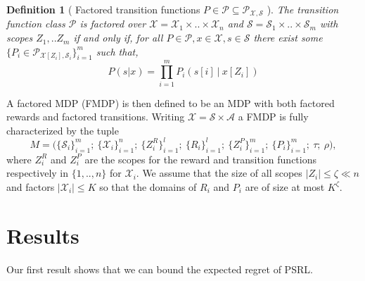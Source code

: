 \documentclass{article}
\newtheorem{mydef}{Definition}
\newcommand{\Xc}{\mathcal{X}}
\newcommand{\Pc}{\mathcal{P}}
\newcommand{\Sc}{\mathcal{S}}
\newcommand{\Ac}{\mathcal{A}}
\begin{document}
\begin{mydef}[ Factored transition functions $P \in \Pc \subseteq \Pc_{\Xc,\Sc}$ ]
\hspace{0.000000001mm} \newline
The transition function class $\Pc$ is factored over $\Xc = \Xc_1 \times .. \times \Xc_n$ and $\Sc = \Sc_1 \times .. \times \Sc_m$ with scopes  $Z_1, .. Z_m$ if and only if,
for all $P \in \Pc, x \in \Xc, s \in \Sc$ there exist some $\{P_i \in \Pc_{\Xc[Z_i],\Sc_i}\}_{i=1}^m$ such that,
$$ P(s | x) = \prod_{i=1}^m P_i \left( s[i] \ \bigg\vert \ x[Z_i] \right) $$
\end{mydef}

A factored MDP (FMDP) is then defined to be an MDP with both factored rewards and factored transitions.
Writing $\Xc = \Sc \times \Ac$ a FMDP is fully characterized by the tuple
$$ M = \big( \{ \Sc_i \}_{i=1}^m ; \  \{ \Xc_i \}_{i=1}^n ; \   \{ Z^R_i \}_{i=1}^l;\  \{ R_i \}_{i=1}^l;\  \{ Z^P_i \}_{i=1}^m;\  \{ P_i \}_{i=1}^m;\  \tau;\  \rho  \big), $$
where $Z^R_i$ and $Z^P_i$ are the scopes for the reward and transition functions respectively in $\{1,..,n \}$ for $\Xc_i$.
We assume that the size of all scopes $| Z_i | \le \zeta \ll n$ and factors $|\Xc_i| \le K$ so that the domains of $R_i$ and $P_i$ are of size at most $K^\zeta$.


\section{Results}


Our first result shows that we can bound the expected regret of PSRL.
\end{document}

